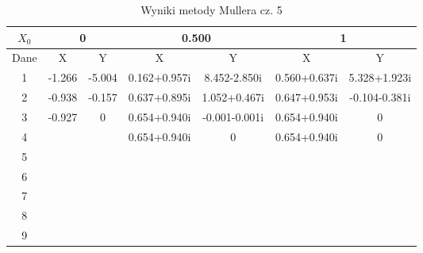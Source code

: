 \documentclass[a4paper, 11pt]{article}
\begin{document}
\begin{enumerate}
\begin{itemize}
\begin{table}[p]
\begin{tabular}{|c|c|c|c|c|c|c|}
\hline                                                                                  
\( X_0 \)  & \multicolumn{2}{c|}{0 } & \multicolumn{2}{c|}{0.500 }&  \multicolumn{2}{c|}{1 }\\                               
\hline                                                                                  
Dane & X & Y & X & Y & X & Y \\                                                        
\hline                                                                                  
1  & -1.266 & -5.004 & 0.162+0.957i & 8.452-2.850i & 0.560+0.637i & 5.328+1.923i \\  
\hline                                                                                  
2  & -0.938 & -0.157 & 0.637+0.895i & 1.052+0.467i & 0.647+0.953i & -0.104-0.381i \\ 
\hline                                                                                  
3  & -0.927 & 0 & 0.654+0.940i & -0.001-0.001i & 0.654+0.940i & 0  \\
\hline                                                                                  
4  &  &  & 0.654+0.940i & 0  & 0.654+0.940i & 0  \\   
\hline                                                                                  
5  &  &  &  &  &  &  \\                                
\hline                                                                                  
6  &  &  &  &  &  &  \\                                
\hline                                                                                  
7  &  &  &  &  &  &  \\                                
\hline                                                                                  
8  &  &  &  &  &  &  \\                                
\hline                                                                                  
9  &  &  &  &  &  &  \\                                
\hline                                                                                  
\end{tabular}                                                                           
\caption{Wyniki metody Mullera cz. 5}                                                   
\label{table:Wyniki metody Mullera cz. 5}                                               
\end{table}                                                                             
\begin{table}[p]                                                                                        



\end{table}
\end{itemize}
\end{enumerate}
\end{document}
